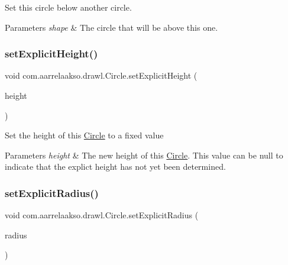 Set this circle below another circle.


\begin{DoxyParams}{Parameters}
{\em shape} & The circle that will be above this one. \\
\hline
\end{DoxyParams}
\mbox{\label{classcom_1_1aarrelaakso_1_1drawl_1_1_circle_a1f11256f2fbfb54b387c0e71d7abfd7d}} 
\subsubsection{\texorpdfstring{set\+Explicit\+Height()}{setExplicitHeight()}}
{\footnotesize\ttfamily void com.\+aarrelaakso.\+drawl.\+Circle.\+set\+Explicit\+Height (\begin{DoxyParamCaption}\item[{@Nullable \hyperlink{classcom_1_1aarrelaakso_1_1drawl_1_1_sisu_big_decimal}{Sisu\+Big\+Decimal}}]{height }\end{DoxyParamCaption})\hspace{0.3cm}{\ttfamily [protected]}}

Set the height of this \hyperlink{classcom_1_1aarrelaakso_1_1drawl_1_1_circle}{Circle} to a fixed value


\begin{DoxyParams}{Parameters}
{\em height} & The new height of this \hyperlink{classcom_1_1aarrelaakso_1_1drawl_1_1_circle}{Circle}. This value can be {\ttfamily null} to indicate that the explict height has not yet been determined. \\
\hline
\end{DoxyParams}
\mbox{\label{classcom_1_1aarrelaakso_1_1drawl_1_1_circle_a12d16906e4e41d57f9e453f6b508bfa7}} 
\subsubsection{\texorpdfstring{set\+Explicit\+Radius()}{setExplicitRadius()}\hspace{0.1cm}{\footnotesize\ttfamily [1/2]}}
{\footnotesize\ttfamily void com.\+aarrelaakso.\+drawl.\+Circle.\+set\+Explicit\+Radius (\begin{DoxyParamCaption}\item[{@Not\+Null \hyperlink{classcom_1_1aarrelaakso_1_1drawl_1_1_sisu_big_decimal}{Sisu\+Big\+Decimal}}]{radius }\end{DoxyParamCaption})\hspace{0.3cm}{\ttfamily [protected]}}

